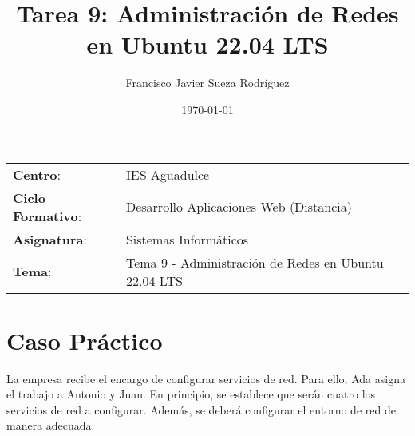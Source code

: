 


\title{
\vspace{10ex}
\normalfont \normalsize
\Huge \textbf{Tarea 9: Administración de Redes en Ubuntu 22.04 LTS}
}
\author{Francisco Javier Sueza Rodríguez}
\date{\normalsize\today}



\maketitle

\thispagestyle{empty}

\vspace{68ex}

\begin{center}
    \begin{tabular}{l l}
        \textbf{Centro}: & IES Aguadulce \\
        \textbf{Ciclo Formativo}: & Desarrollo Aplicaciones Web (Distancia)\\
        \textbf{Asignatura}: & Sistemas Informáticos\\
        \textbf{Tema}: & Tema 9 -  Administración de Redes en Ubuntu 22.04 LTS\\
    \end{tabular}
\end{center}

\newpage

\tableofcontents

\newpage

\listoffigures

\newpage

\section{Caso Práctico}
La empresa recibe el encargo de configurar servicios de red. Para ello, Ada asigna el trabajo a Antonio y Juan. En principio, se establece que serán cuatro los servicios de red a configurar. Además, se deberá configurar el entorno de red de manera adecuada.

